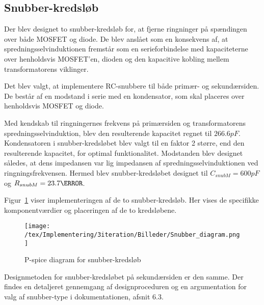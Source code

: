 
\subsection{Snubber-kredsløb}
Der blev designet to snubber-kredsløb for, at fjerne ringninger på spændingen over både MOSFET og diode. De blev anslået som en konsekvens af, at spredningsselvinduktionen fremstår som en serieforbindelse med kapaciteterne over henholdsvis MOSFET'en, dioden og den kapacitive kobling mellem transformatorens viklinger.  

Det blev valgt, at implementere RC-snubbere til både primær- og sekundærsiden. De består af en modstand i serie med en kondensator, som skal placeres over henholdsvis MOSFET og diode. 

Med kendskab til ringningernes frekvens på primærsiden og transformatorens spredningsselvinduktion, blev den resulterende kapacitet regnet til $266.6pF$. Kondensatoren i snubber-kredsløbet blev valgt til en faktor 2 større, end den resulterende kapacitet, for optimal funktionalitet\cite{snubber_design}. Modstanden blev designet således, at dens impedansen var lig impedansen af spredningsselvinduktionen ved ringningsfrekvensen. Hermed blev snubber-kredsløbet designet til $C_{snubM} = 600pF$ og $R_{snubM} = 23.7\ohm$. 

Figur~\ref{fig:snubber_diagram} viser implementeringen af de to snubber-kredsløb. Her vises de specifikke komponentværdier og placeringen af de to kredsløbene.

\begin{figure}[H]
	\centering
	\texttt{[image: /tex/Implementering/3iteration/Billeder/Snubber\_diagram.png]}
	\caption{P-spice diagram for snubber-kredsløb}
	\label{fig:snubber_diagram}
\end{figure}

\noindent Designmetoden for snubber-kredsløbet på sekundærsiden er den samme. Der findes en detaljeret gennemgang af designproceduren og en argumentation for valg af snubber-type i dokumentationen, afsnit 6.3.

